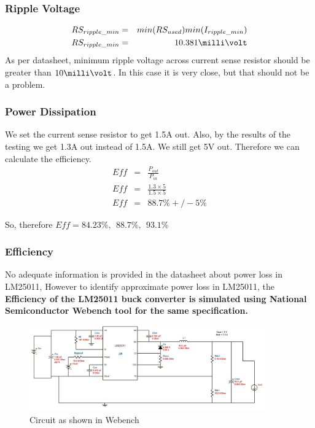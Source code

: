 \subsubsection{Ripple Voltage}
\begin{eqnarray}
RS_{ripple\_min}&=&min(RS_{used})min(I_{ripple\_min})\\
RS_{ripple\_min}&=&10.381 \milli\volt
\end{eqnarray}
As per datasheet, minimum ripple voltage across current sense resistor should be greater than $10\milli\volt$. In this case it is very close, but that should not be a problem.

\subsubsection{Power Dissipation}
We set the current sense resistor to get 1.5A out. Also, by the results of the testing we get 1.3A out instead of 1.5A. We still get 5V out. Therefore we can calculate the efficiency.
\begin{eqnarray}
Eff&=&\frac{P_{out}}{P_{in}}\\
Eff&=&\frac{1.3 \times 5}{1.5 \times 5}\\
Eff&=&88.7\% +/- 5\%
\end{eqnarray}

So, therefore $Eff=84.23\percent,\ \ 88.7\percent,\ \ 93.1\percent$

\subsubsection{Efficiency}
No adequate information is provided in the datasheet about power loss in LM25011, However to identify approximate power loss in LM25011, the \textbf{Efficiency of the LM25011 buck converter is simulated using National Semiconductor Webench tool for the same specification.}\cite{WEBENCH}

\begin{figure}[htbp]
\begin{center}
\includegraphics[width=4in]{includes/WebenchCircuit}
\caption{Circuit as shown in Webench}
\label{fig:1}
\end{center}
\end{figure}

